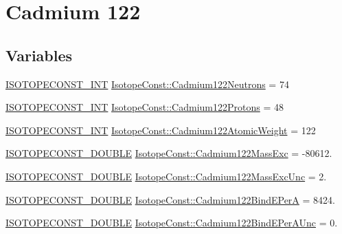 \hypertarget{group___isotope_const-_cadmium-_cd122}{}\section{Cadmium 122}
\label{group___isotope_const-_cadmium-_cd122}
\subsection*{Variables}
\begin{DoxyCompactItemize}
\item 
\mbox{\hyperlink{group___isotope_const-_macros_ga5f18360b3e99483a35c32d789e62621c}{I\+S\+O\+T\+O\+P\+E\+C\+O\+N\+S\+T\+\_\+\+I\+NT}} \mbox{\hyperlink{group___isotope_const-_cadmium-_cd122_ga6765ccfdb193fc9574958ceffdfe7792}{Isotope\+Const\+::\+Cadmium122\+Neutrons}} = 74
\item 
\mbox{\hyperlink{group___isotope_const-_macros_ga5f18360b3e99483a35c32d789e62621c}{I\+S\+O\+T\+O\+P\+E\+C\+O\+N\+S\+T\+\_\+\+I\+NT}} \mbox{\hyperlink{group___isotope_const-_cadmium-_cd122_gaa6ed6349007bbcc4d22b36279a41c9ab}{Isotope\+Const\+::\+Cadmium122\+Protons}} = 48
\item 
\mbox{\hyperlink{group___isotope_const-_macros_ga5f18360b3e99483a35c32d789e62621c}{I\+S\+O\+T\+O\+P\+E\+C\+O\+N\+S\+T\+\_\+\+I\+NT}} \mbox{\hyperlink{group___isotope_const-_cadmium-_cd122_gadd9747ca7580f75c1c367fb6398ee433}{Isotope\+Const\+::\+Cadmium122\+Atomic\+Weight}} = 122
\item 
\mbox{\hyperlink{group___isotope_const-_macros_ga8f45a7272ce02c0b4c65c44636ed719a}{I\+S\+O\+T\+O\+P\+E\+C\+O\+N\+S\+T\+\_\+\+D\+O\+U\+B\+LE}} \mbox{\hyperlink{group___isotope_const-_cadmium-_cd122_ga32b29f266f8020ce76863d7b9de7efcd}{Isotope\+Const\+::\+Cadmium122\+Mass\+Exc}} = -\/80612.
\item 
\mbox{\hyperlink{group___isotope_const-_macros_ga8f45a7272ce02c0b4c65c44636ed719a}{I\+S\+O\+T\+O\+P\+E\+C\+O\+N\+S\+T\+\_\+\+D\+O\+U\+B\+LE}} \mbox{\hyperlink{group___isotope_const-_cadmium-_cd122_ga49da5422d4079acaab633240dced4007}{Isotope\+Const\+::\+Cadmium122\+Mass\+Exc\+Unc}} = 2.
\item 
\mbox{\hyperlink{group___isotope_const-_macros_ga8f45a7272ce02c0b4c65c44636ed719a}{I\+S\+O\+T\+O\+P\+E\+C\+O\+N\+S\+T\+\_\+\+D\+O\+U\+B\+LE}} \mbox{\hyperlink{group___isotope_const-_cadmium-_cd122_gab3ee3c5a7c3d8550bbe183aa4905fcee}{Isotope\+Const\+::\+Cadmium122\+Bind\+E\+PerA}} = 8424.
\item 
\mbox{\hyperlink{group___isotope_const-_macros_ga8f45a7272ce02c0b4c65c44636ed719a}{I\+S\+O\+T\+O\+P\+E\+C\+O\+N\+S\+T\+\_\+\+D\+O\+U\+B\+LE}} \mbox{\hyperlink{group___isotope_const-_cadmium-_cd122_ga642a5422a47f619fcf5955e1292f2bb3}{Isotope\+Const\+::\+Cadmium122\+Bind\+E\+Per\+A\+Unc}} = 0.

\end{DoxyCompactItemize}
